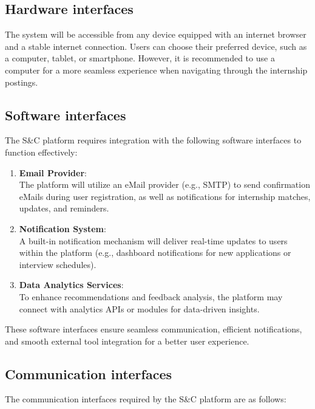 \subsection{Hardware interfaces}
\label{subsec:hardware_interfaces}%


The system will be accessible from any device equipped with an internet
browser and a stable internet connection. Users can choose their
preferred device, such as a computer, tablet, or smartphone. However, it
is recommended to use a computer for a more seamless experience when
navigating through the internship postings.


\subsection{Software interfaces}
\label{subsec:software_interfaces}%


The S\&C platform requires integration with the following software
interfaces to function effectively:

\begin{enumerate}
\def\labelenumi{\arabic{enumi}.}
\item
  \textbf{Email Provider}:\\
  The platform will utilize an eMail provider (e.g., SMTP) to send
  confirmation eMails during user registration, as well as notifications
  for internship matches, updates, and reminders.
\item
  \textbf{Notification System}:\\
  A built-in notification mechanism will deliver real-time updates to
  users within the platform (e.g., dashboard notifications for new
  applications or interview schedules).
\item
  \textbf{Data Analytics Services}:\\
  To enhance recommendations and feedback analysis, the platform may
  connect with analytics APIs or modules for data-driven insights.
\end{enumerate}

These software interfaces ensure seamless communication, efficient
notifications, and smooth external tool integration for a better user
experience.


\subsection{Communication interfaces}
\label{subsec:communication_interfaces}%


The communication interfaces required by the S\&C platform are as
follows:

